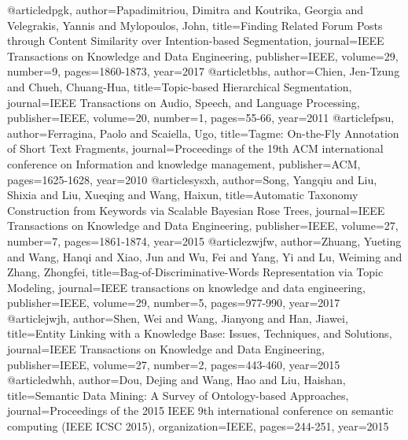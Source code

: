 \documentclass[a4paper, 12pt]{report}
\begin{document}
@article{dpgk,  
author={Papadimitriou, Dimitra and Koutrika, Georgia and Velegrakis, Yannis and Mylopoulos, John},  
title={{Finding Related Forum Posts through Content Similarity over Intention-based Segmentation}},  
journal={IEEE Transactions on Knowledge and Data Engineering},  
publisher={IEEE}, 
volume={29},   
number={9},  
pages={1860-1873},  
year={2017} } 
@article{tbhs,  
author={Chien, Jen-Tzung and Chueh, Chuang-Hua}, 
title={{Topic-based Hierarchical Segmentation}},  
journal={IEEE Transactions on Audio, Speech, and Language Processing},   publisher={IEEE},
volume={20},   
number={1}, 
pages={55-66},  
year={2011}
} 
@article{fpsu,  
author={Ferragina, Paolo and Scaiella, Ugo}, 
title={{Tagme: On-the-Fly Annotation of Short Text Fragments}},
journal={Proceedings of the 19th ACM international conference on Information and knowledge management},
publisher={ACM}, 
pages={1625-1628},  
year={2010} 
}
@article{sysxh,  
author={Song, Yangqiu and Liu, Shixia and Liu, Xueqing and Wang, Haixun},   
title={{Automatic Taxonomy Construction from Keywords via Scalable Bayesian Rose Trees}},  
journal={IEEE Transactions on Knowledge and Data Engineering},
publisher={IEEE},   
volume={27},  
number={7},  
pages={1861-1874}, 
year={2015} 
}  
@article{zwjfw,
author={Zhuang, Yueting and Wang, Hanqi and Xiao, Jun and Wu, Fei and Yang, Yi and Lu, Weiming and Zhang, Zhongfei}, 
title={{Bag-of-Discriminative-Words Representation via Topic Modeling}},   
journal={IEEE transactions on knowledge and data engineering},  
publisher={IEEE},  
volume={29},  
number={5},   
pages={977-990}, 
year={2017}
}  
@article{jwjh,  
author={Shen, Wei and Wang, Jianyong and Han, Jiawei}, 
title={{Entity Linking with a Knowledge Base: Issues, Techniques, and Solutions}}, 
journal={IEEE Transactions on Knowledge and Data Engineering}, 
publisher={IEEE}, 
volume={27},  
number={2}, 
pages={443-460}, 
year={2015}
}
@article{dwhh,
author={Dou, Dejing and Wang, Hao and Liu, Haishan}, 
title={{Semantic Data Mining: A Survey of Ontology-based Approaches}},   
journal={Proceedings of the 2015 IEEE 9th international conference on semantic computing (IEEE ICSC 2015)},  
organization={IEEE}, 
pages={244-251}, 
year={2015} }
\end{document}
